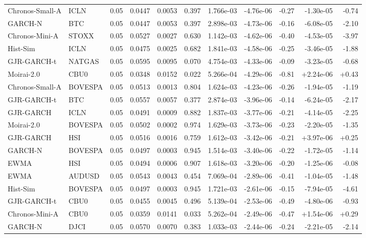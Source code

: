 \begin{tabular}{llrrrrrrrrr}
Chronos-Small-A & ICLN & 0.05 & 0.0447 & 0.0053 & 0.397 & 1.766e-03 & -4.76e-06 & -0.27 & -1.30e-05 & -0.74 \\
GARCH-N & BTC & 0.05 & 0.0447 & 0.0053 & 0.397 & 2.898e-03 & -4.73e-06 & -0.16 & -6.08e-05 & -2.10 \\
Chronos-Mini-A & STOXX & 0.05 & 0.0527 & 0.0027 & 0.630 & 1.142e-03 & -4.62e-06 & -0.40 & -4.53e-05 & -3.97 \\
Hist-Sim & ICLN & 0.05 & 0.0475 & 0.0025 & 0.682 & 1.841e-03 & -4.58e-06 & -0.25 & -3.46e-05 & -1.88 \\
GJR-GARCH-t & NATGAS & 0.05 & 0.0595 & 0.0095 & 0.070 & 4.754e-03 & -4.33e-06 & -0.09 & -3.23e-05 & -0.68 \\
Moirai-2.0 & CBU0 & 0.05 & 0.0348 & 0.0152 & 0.022 & 5.266e-04 & -4.29e-06 & -0.81 & +2.24e-06 & +0.43 \\
Chronos-Small-A & BOVESPA & 0.05 & 0.0513 & 0.0013 & 0.804 & 1.624e-03 & -4.23e-06 & -0.26 & -1.94e-05 & -1.19 \\
GJR-GARCH-t & BTC & 0.05 & 0.0557 & 0.0057 & 0.377 & 2.874e-03 & -3.96e-06 & -0.14 & -6.24e-05 & -2.17 \\
GJR-GARCH & ICLN & 0.05 & 0.0491 & 0.0009 & 0.882 & 1.837e-03 & -3.77e-06 & -0.21 & -4.14e-05 & -2.25 \\
Moirai-2.0 & BOVESPA & 0.05 & 0.0502 & 0.0002 & 0.974 & 1.629e-03 & -3.73e-06 & -0.23 & -2.20e-05 & -1.35 \\
GJR-GARCH & HSI & 0.05 & 0.0516 & 0.0016 & 0.759 & 1.612e-03 & -3.42e-06 & -0.21 & +3.97e-06 & +0.25 \\
GARCH-N & BOVESPA & 0.05 & 0.0497 & 0.0003 & 0.945 & 1.514e-03 & -3.40e-06 & -0.22 & -1.72e-05 & -1.14 \\
EWMA & HSI & 0.05 & 0.0494 & 0.0006 & 0.907 & 1.618e-03 & -3.20e-06 & -0.20 & -1.25e-06 & -0.08 \\
EWMA & AUDUSD & 0.05 & 0.0543 & 0.0043 & 0.454 & 7.069e-04 & -2.89e-06 & -0.41 & -1.04e-05 & -1.48 \\
Hist-Sim & BOVESPA & 0.05 & 0.0497 & 0.0003 & 0.945 & 1.721e-03 & -2.61e-06 & -0.15 & -7.94e-05 & -4.61 \\
GJR-GARCH-t & CBU0 & 0.05 & 0.0455 & 0.0045 & 0.496 & 5.139e-04 & -2.53e-06 & -0.49 & -4.80e-06 & -0.93 \\
Chronos-Mini-A & CBU0 & 0.05 & 0.0359 & 0.0141 & 0.033 & 5.262e-04 & -2.49e-06 & -0.47 & +1.54e-06 & +0.29 \\
GARCH-N & DJCI & 0.05 & 0.0570 & 0.0070 & 0.383 & 1.033e-03 & -2.44e-06 & -0.24 & -2.21e-05 & -2.14 \\

\end{tabular}
